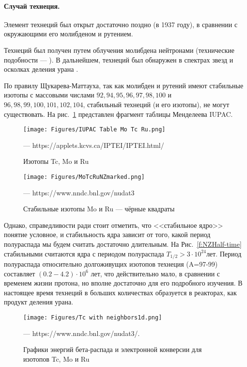 \documentclass[a5paper,openany]{book}
\begin{document}
\paragraph{Случай технеция.}
Элемент технеций был открыт достаточно поздно (в 1937 году), в сравнении с окружающими его молибденом и рутением. 



Технеций был получен путем облучения молибдена нейтронами (технические подобности --- \cite{Mausolf2021}). В дальнейшем, технеций был обнаружен в спектрах звезд и осколках деления урана \cite{Technetium2017}. 

По правилу Щукарева-Маттауха, так как молибден и рутений имеют стабильные изотопы с массовыми числами $92, 94, 95, 96, 97, 98, 100$ и $96, 98, 99, 100, 101, 102, 104$, стабильный технеций (и его изотопы), не могут существовать.  На рис.~\ref{f:IUPAC Table Mo Tc Ru} представлен фрагмент таблицы Менделеева IUPAC.

\begin{figure}[ht] 
	\centering\small
	\unitlength=1mm
	\texttt{[image: Figures/IUPAC Table Mo Tc Ru.png]} 
	\caption{Изотопы Tc, Mo и Ru} --- https://applets.kcvs.ca/IPTEI/IPTEI.html/
	\label{f:IUPAC Table Mo Tc Ru}
\end{figure}

\begin{figure}[ht] 
	\centering\small
	\unitlength=1mm
	\texttt{[image: Figures/MoTcRuNZmarked.png]} 
	\caption{Стабильные изотопы Mo и Ru --- чёрные квадраты} --- https://www.nndc.bnl.gov/nudat3 
	\label{f:T half time Mo Tc Ru.png}
\end{figure}




Однако, справедливости ради стоит отметить, что <<стабильное ядро>> понятие условное, и стабильность ядра зависит от того, какой период полураспада мы будем считать достаточно длительным. На Рис.~\ref{f:NZHalf-time} стабильными считаются ядра с периодом полураспада $T_{1/2}>3 \cdot 10^{24} $лет. Период полураспада относительно долгоживущих изотопов технеция (A=97-99) составляет $ (0.2-4.2) \cdot 10^{6}$ лет, что действительно мало, в сравнении с временем жизни протона, но вполне достаточно для его подробного изучения. В настоящее время технеций в больших количествах образуется в реакторах, как продукт деления урана.

\begin{figure}[ht] 
	\centering\small
	\unitlength=1mm
	\texttt{[image: Figures/Tc with neighbors1d.png]} 
	\caption{Графики энергий бета-распада и электронной конверсии для изотопов Tc, Mo и Ru} --- https://www.nndc.bnl.gov/nudat3/. 
	\label{f:Tc with neighbors}
\end{figure}
\end{document}
